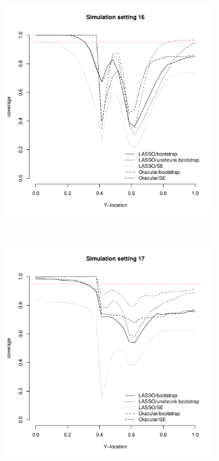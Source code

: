\documentclass[authoryear, review, 11pt]{elsarticle}
\begin{document}
	
	\begin{figure}
		\centering
		\begin{subfigure}[b]{0.3\textwidth}
			\centering
			\includegraphics[width=\textwidth]{../../figures/simulation/28-16-profile-coverage.pdf}
			\label{fig:gull}
		\end{subfigure}%
        ~ %
		\begin{subfigure}[b]{0.3\textwidth}
			\centering
			\includegraphics[width=\textwidth]{../../figures/simulation/28-17-profile-coverage.pdf}

\end{subfigure}
\end{figure}
\end{document}

